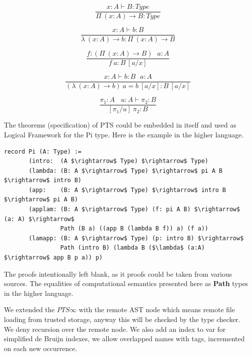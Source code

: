 \documentclass{aip-cp}
\begin{document}
\begin{equation}
\tag{$\Pi$-formation}
\dfrac
{x:A \vdash B : Type}
{\Pi\ (x:A) \rightarrow B : Type}
\end{equation}

\begin{equation}
\tag{$\lambda$-intro}
\dfrac
{x:A \vdash b : B}
{\lambda\ (x:A) \rightarrow b : \Pi\ (x: A) \rightarrow B }
\end{equation}

\begin{equation}
\tag{$App$-elimination}
\dfrac
{f: (\Pi\ (x:A) \rightarrow B)\ \ \ a: A}
{f\ a : B\ [a/x]}
\end{equation}

\begin{equation}
\tag{$\beta$-computation}
\dfrac
{x:A \vdash b: B\ \ \ a:A}
{(\lambda\ (x:A) \rightarrow b)\ a = b\ [a/x] : B\ [a/x]}
\end{equation}

\begin{equation}
\tag{subst}
\dfrac
{\pi_1 : A\ \ \ \ u:A \vdash \pi_2 : B}
{[\pi_1/u]\ \pi_2 : B}
\end{equation}

The theorems (specification) of PTS could be embedded in itself and used as
Logical Framework for the Pi type. Here is the example in the higher language.

\begin{lstlisting}[mathescape=true]
record Pi (A: Type) :=
       (intro:  (A $\rightarrow$ Type) $\rightarrow$ Type)
       (lambda: (B: A $\rightarrow$ Type) $\rightarrow$ pi A B $\rightarrow$ intro B)
       (app:    (B: A $\rightarrow$ Type) $\rightarrow$ intro B $\rightarrow$ pi A B)
       (applam: (B: A $\rightarrow$ Type) (f: pi A B) $\rightarrow$ (a: A) $\rightarrow$
                Path (B a) ((app B (lambda B f)) a) (f a))
       (lamapp: (B: A $\rightarrow$ Type) (p: intro B) $\rightarrow$
                Path (intro B) (lambda B ($\lambda$ (a:A) $\rightarrow$ app B p a)) p)
\end{lstlisting}

The proofs intentionally left blank, as it proofs could be taken from various sources.
The equalities of computational semantics presented here as {\bf Path} types in the higher language.

We extended the {\bf $PTS\infty$} with the remote AST node which means remote file loading
from trusted storage, anyway this will be checked by the type checker. We deny recursion
over the remote node. We also add an index to var for simplified de Bruijn indexes,
we allow overlapped names with tags, incremented on each new occurrence.
\end{document}
